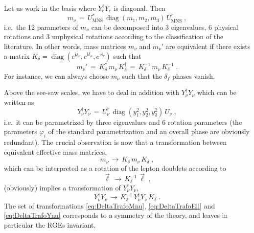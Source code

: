 \documentclass[12pt,a4paper,twoside]{scrartcl}
\DeclareMathOperator{\diag}{diag}
\def\I{\mathrm{i}}
\numberwithin{equation}{section}
\numberwithin{table}{section}
\begin{document}
Let us work in the basis where $Y_e^\dagger Y_e$ is diagonal. Then
\begin{equation}
 m_\nu
 \,=\,
 U_\mathrm{MNS}^*\,\diag(m_1,m_2,m_3)\,U_\mathrm{MNS}^\dagger\;,
\end{equation}
i.e.\ the 12 parameters of $m_\nu$ can be decomposed into 3 eigenvalues, 6
physical rotations and 3 unphysical rotations according to the classification
of the literature. In other words, mass matrices $m_\nu$ and $m_\nu'$ are
equivalent if there exists a matrix
$K_\delta=\diag(e^{\I\delta_e},e^{\I\delta_\mu},e^{\I\delta_\tau})$ such that
\begin{equation}
 m_\nu'
 \,=\,K_\delta^*\,m_\nu\,K_\delta^\dagger 
 \,=\,K_\delta^{-1}\,m_\nu\,K_\delta^{-1}\;.
\end{equation}
For instance, we can always choose $m_\nu$ such that the $\delta_f$ phases
vanish.

Above the see-saw scales, we have to deal in addition with $Y_\nu^\dagger Y_\nu$
which can be written as
\begin{equation}
 Y_\nu^\dagger Y_\nu\,=\,
 U_\nu^\dagger\,\diag(y_1^2,y_2^2,y_3^2)\,U_\nu\;,
\end{equation}
i.e.\ it can be parametrized by three eigenvalues and 6 rotation parameters (the
parameters $\varphi_i$ of the standard parametrization and an overall phase are
obviously redundant). The crucial observation is now that a transformation
between equivalent effective mass matrices,
\begin{equation}\label{eq:DeltaTrafoMnu}
 m_\nu\,\to\,
 K_\delta\,m_\nu\,K_\delta\;,
\end{equation}
which can be interpreted as a rotation of the lepton doublets according to
\begin{equation}\label{eq:DeltaTrafoEll}
 \vec \ell\,\to\, K_\delta^{-1}\,\vec \ell\;,
\end{equation}
(obviously) implies a transformation of $Y_\nu^\dagger Y_\nu$, 
\begin{equation}\label{eq:DeltaTrafoYnu}
 Y_\nu^\dagger Y_\nu\,\to\,
 K_\delta^{-1}\,Y_\nu^\dagger Y_\nu\,K_\delta\;.
\end{equation}
The set of transformations \eqref{eq:DeltaTrafoMnu}, \eqref{eq:DeltaTrafoEll}
and \eqref{eq:DeltaTrafoYnu} corresponds to a symmetry of the theory, and leaves
in particular the RGEs invariant. 
\end{document}
